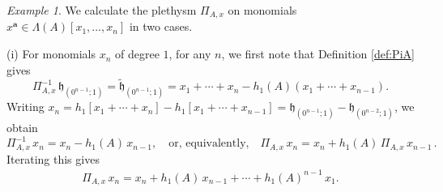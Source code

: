 \documentclass[12pt]{amsart}
\theoremstyle{definition}
\theoremstyle{remark}
\newtheorem{example}[thm]{Example}
\newcommand{\aA}{{\mathbf a}}
\newcommand{\fh}{{\mathfrak h}}
\newcommand{\tfh}{{\widetilde{\mathfrak h}}}
\begin{document}
\begin{example}
\label{ex nspleth n2} We calculate the plethysm $\Pi_{A,x}$ on
monomials $x^{\aA }\in \Lambda(A)[x_1,\dots, x_n]$ in two cases.

(i) For monomials $x_{n}$ of degree $1$, for any $n$, we first note
that Definition \ref{def:PiA} gives
\begin{equation}\label{e:PiA-inv-h1 v0}
\Pi _{A,x}^{-1}\, \fh_{(0^{n-1};1)} = \tfh_{(0^{n-1};1)} =
x_{1}+\cdots +x_{n} - h_{1}(A)(x_{1}+\cdots +x_{n-1}).
\end{equation}
Writing $x_{n} = h_{1}[x_{1}+\cdots +x_{n}] - h_{1}[x_{1}+\cdots
+x_{n-1}] = \fh _{(0^{n-1};1)} - \fh _{(0^{n-2};1)}$,
we obtain
\begin{equation}\label{e:PiA-inv-y1}\Pi _{A,x}^{-1}\, x_n = x_n -
h_{1}(A)\, x_{n-1},\quad \text{or, equivalently,}\quad \Pi_{A,x}\, x_n
=x_n+h_1(A)\, \Pi_{A,x}\, x_{n-1}\,.
\end{equation}
Iterating this gives
\begin{gather}\label{e:PiA-xn}
\Pi _{A,x}\, x_{n} = x_{n} + h_{1}(A)\, x_{n-1} +\cdots
+h_{1}(A)^{n-1}\, x_{1}.
\end{gather}


\end{example}
\end{document}
